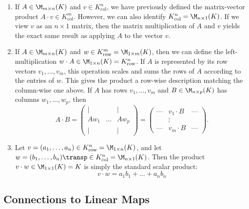 \begin{enumerate}
    \item If $A \in \M_{m \times n}(K)$ and $v \in K_{\text{col}}^{n}$, we have previously defined the matrix-vector product $A \cdot v \in K_{\text{col}}^{m}$. However, we can also identify $K_{\text{col}}^{n} = \M_{n \times 1}(K)$. If we view $v$ as an $n \times 1$ matrix, then the matrix multiplication of $A$ and $v$ yields the exact same result as applying $A$ to the vector $v$.
    
    \item If $A \in \M_{m \times n}(K)$ and $w \in K_{\text{row}}^{m} = \M_{1 \times m}(K)$, then we can define the left-multiplication $w \cdot A \in \M_{1 \times n}(K) = K_{\text{row}}^{n}$. If $A$ is represented by its row vectors $v_1, \dots, v_m$, this operation scales and sums the rows of $A$ according to the entries of $w$.
    This gives the product a row-wise description matching the column-wise one above. If $A$ has rows $v_1, \dots, v_m$ and $B \in \M_{n \times p}(K)$ has columns $w_1, \dots, w_p$, then
    \begin{equation*}
        A \cdot B = \begin{pmatrix} | & & | \\ A w_1 & \dots & A w_p \\ | & & | \end{pmatrix} = \begin{pmatrix} \text{---} & v_1 \cdot B & \text{---} \\ & \vdots & \\ \text{---} & v_m \cdot B & \text{---} \end{pmatrix}.
    \end{equation*}
    
    \item Let $v = (a_1, \dots, a_n) \in K_{\text{row}}^{n} = \M_{1 \times n}(K)$, and let $w = (b_1, \dots, b_n)\transp \in K_{\text{col}}^{n} = \M_{n \times 1}(K)$. Then the product $v \cdot w \in \M_{1 \times 1}(K) = K$ is simply the standard scalar product:
    \begin{equation*}
        v \cdot w = a_1 b_1 + \dots + a_n b_n
    \end{equation*}
\end{enumerate}

\subsection{Connections to Linear Maps}

